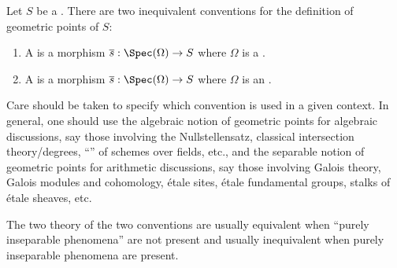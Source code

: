 \begin{definition} \label{definition:geometric_point_of_a_scheme}
Let $S$ be a . There are two inequivalent conventions for the definition of geometric points of $S$:
\begin{enumerate}
    \item A  is a morphism $\overline{s} : \Spec(\Omega) \to S$ where $\Omega$ is a . 

    \item A  is a morphism $\overline{s} : \Spec(\Omega) \to S$ where $\Omega$ is an . 
\end{enumerate}
Care should be taken to specify which convention is used in a given context. In general, one should use the algebraic notion of geometric points for algebraic discussions, say those  involving the Nullstellensatz, classical intersection theory/degrees, ``'' of schemes over fields, etc., and the separable notion of geometric points for arithmetic discussions, say those involving Galois theory, Galois modules and cohomology, \'etale sites, \'etale fundamental groups, stalks of \'etale sheaves, etc. 

The two theory of the two conventions are usually equivalent when ``purely inseparable phenomena'' are not present and usually inequivalent when purely inseparable phenomena are present. 
\end{definition}